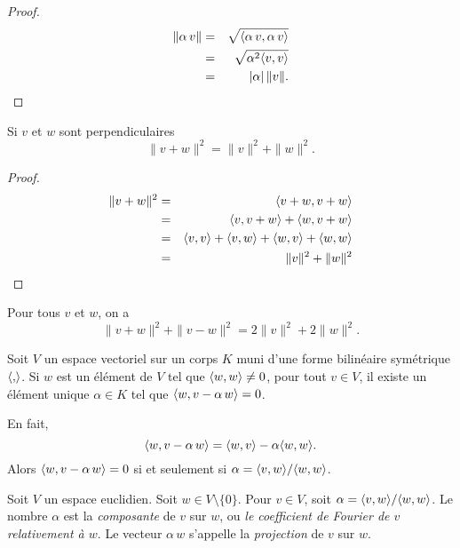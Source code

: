 \begin{proof}
  \begin{eqnarray*}    
   \| \alpha \,v \| & = &  \sqrt{\langle {\alpha \, v, \alpha \, v} \rangle } \\
                    & = & \sqrt{\alpha^2 \langle {v,v} \rangle} \\
                    & = & |\alpha | \, \|v\|. 
  \end{eqnarray*}
\end{proof}

\begin{proposition}
\label{prop:4}
Si $v$ et $w$ sont perpendiculaires 
\begin{displaymath}
  \|v+w\|^2 = \|v\|^2 + \|w\|^2. 
\end{displaymath}  
\end{proposition}


\begin{proof}
  \begin{eqnarray*}
     \|v+w\|^2 &= & \langle {v+w,v+w} \rangle \\
               & = & \langle {v,v+w} \rangle + \langle {w,v+w} \rangle \\
               & = & \langle {v,v} \rangle + \langle {v,w} \rangle + \langle {w,v} \rangle + \langle {w,w} \rangle \\
               & = & \|v\|^2 + \|w\|^2
  \end{eqnarray*}
\end{proof}

\begin{proposition} Pour tous $v$ et $w$, on a 
  \begin{displaymath}
    \|v+w\|^2 + \|v-w\|^2 = 2 \|v\|^2 + 2 \|w\|^2.  
  \end{displaymath}  
\end{proposition}



Soit $V$ un espace vectoriel sur un corps $K$ muni d'une forme bilinéaire symétrique  $\langle {,} \rangle$. 
Si $w$ est un élément de $V$ tel que $\langle {w,w} \rangle \neq 0$, pour  tout $v \in V$, il existe un élément unique $\alpha \in K$ tel que $\langle {w,v -\alpha\, w} \rangle = 0$. 

En fait,
\begin{displaymath}
  \langle {w,v -\alpha\, w} \rangle = \langle {w,v} \rangle - \alpha \langle {w,w} \rangle. 
\end{displaymath}
Alors $\langle {w,v -\alpha\, w} \rangle = 0$ si et seulement si $\alpha = \langle {v,w} \rangle / \langle {w,w} \rangle$. 


\begin{definition}
  \label{def:6}
  Soit $V$ un espace euclidien. 
  Soit $w \in V \setminus \{0\}$. Pour $v \in V$, soit $\alpha = \langle {v,w} \rangle / \langle {w,w} \rangle$.  Le nombre $\alpha$ est la \emph{composante} de $v$ sur $w$, ou \emph{le coefficient de Fourier de $v$ relativement à $w$}. Le vecteur $\alpha \, w$ s'appelle la \emph{projection} de $v$ sur $w$. 
\end{definition}


